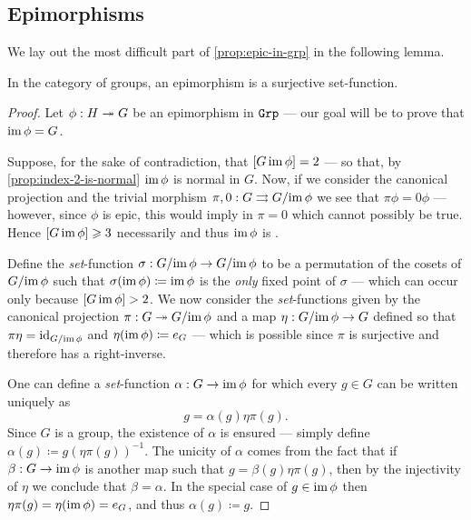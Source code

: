\subsection{Epimorphisms}

We lay out the most difficult part of \cref{prop:epic-in-grp} in the following
lemma.

\begin{lemma}
    \label{lem:epimorphism-is-surjective-grp}
    In the category of groups, an epimorphism is a surjective set-function.
\end{lemma}

\begin{proof}
    Let \(\phi: H \twoheadrightarrow G\) be an epimorphism in \({\texttt{Grp}}\) --- our goal will be to
    prove that \(\operatorname{im} \phi = G\).

    Suppose, for the sake of contradiction, that \([G \relax \operatorname{im} \phi] = 2\) --- so
    that, by \cref{prop:index-2-is-normal} \(\operatorname{im} \phi\) is normal in \(G\). Now, if
    we consider the canonical projection and the trivial morphism
    \(\pi, 0: G \rightrightarrows G/{\operatorname{im} \phi}\) we see that \(\pi \phi = 0 \phi\)
    --- however, since \(\phi\) is epic, this would imply in \(\pi = 0\) which
    cannot possibly be true. Hence \([G \relax \operatorname{im} \phi] \geqslant 3\) necessarily and
    thus \(\operatorname{im} \phi\) is .

    Define the \emph{set}-function \(\sigma: G/{\operatorname{im} \phi} \to G/{\operatorname{im} \phi}\) to be a
    permutation of the cosets of \(G/{\operatorname{im} \phi}\) such that
    \(\sigma(\operatorname{im} \phi) \coloneq \operatorname{im} \phi\) is the \emph{only} fixed point of
    \(\sigma\) --- which can occur only because \([G \relax \operatorname{im} \phi] > 2\). We now
    consider the \emph{set}-functions given by the canonical projection
    \(\pi: G \twoheadrightarrow G/{\operatorname{im} \phi}\) and a map \(\eta: G/{\operatorname{im} \phi} \to G\) defined so
    that \(\pi \eta = \operatorname{id}_{G/{\operatorname{im} \phi}}\) and \(\eta(\operatorname{im} \phi) \coloneq e_G\) ---
    which is possible since \(\pi\) is surjective and therefore has a right-inverse.

    One can define a \emph{set}-function \(\alpha: G \to \operatorname{im} \phi\) for which every
    \(g \in G\) can be written uniquely as
    \begin{equation}\label{eq:write-uniquely-g}
        g = \alpha(g) \eta \pi(g).
    \end{equation}
    Since \(G\) is a group, the existence of \(\alpha\) is ensured --- simply define
    \(\alpha(g) \coloneq g (\eta \pi(g))^{-1}\).  The unicity of \(\alpha\) comes
    from the fact that if \(\beta: G \to \operatorname{im} \phi\) is another map such that
    \(g = \beta(g) \eta \pi(g)\), then by the injectivity of \(\eta\) we conclude
    that \(\beta = \alpha\). In the special case of \(g \in \operatorname{im} \phi\) then
    \(\eta\pi(g) = \eta(\operatorname{im} \phi) = e_G\), and thus \(\alpha(g) \coloneq g\).


\end{proof}
